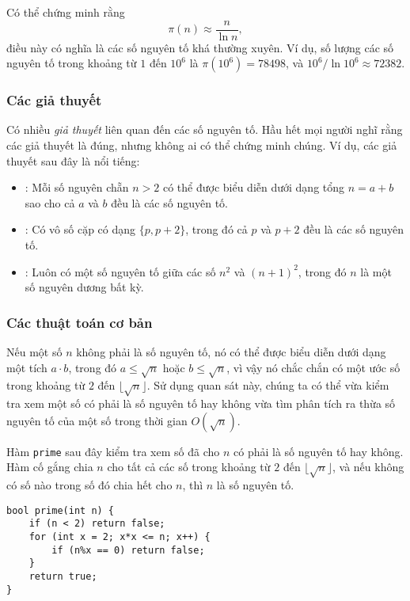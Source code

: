 Có thể chứng minh rằng
\[\pi(n) \approx \frac{n}{\ln n},\]
điều này có nghĩa là các số nguyên tố khá thường xuyên.
Ví dụ, số lượng các số nguyên tố trong khoảng từ
$1$ đến $10^6$ là $\pi(10^6)=78498$,
và $10^6 / \ln 10^6 \approx 72382$.

\subsubsection{Các giả thuyết}

Có nhiều \emph{giả thuyết} liên quan đến các số nguyên tố.
Hầu hết mọi người nghĩ rằng các giả thuyết là đúng,
nhưng không ai có thể chứng minh chúng.
Ví dụ, các giả thuyết sau đây là nổi tiếng:

\begin{itemize}
\item {}:
Mỗi số nguyên chẵn $n>2$ có thể được biểu diễn dưới dạng
tổng $n=a+b$ sao cho cả $a$ và $b$ đều là các số nguyên tố.
\item {}:
Có vô số cặp
có dạng $\{p,p+2\}$,
trong đó cả $p$ và $p+2$ đều là các số nguyên tố.
\item {}:
Luôn có một số nguyên tố giữa các số
$n^2$ và $(n+1)^2$, trong đó $n$ là một số nguyên dương bất kỳ.
\end{itemize}

\subsubsection{Các thuật toán cơ bản}

Nếu một số $n$ không phải là số nguyên tố,
nó có thể được biểu diễn dưới dạng một tích $a \cdot b$,
trong đó $a \le \sqrt n$ hoặc $b \le \sqrt n$,
vì vậy nó chắc chắn có một ước số trong khoảng từ $2$ đến $\lfloor \sqrt n \rfloor$.
Sử dụng quan sát này, chúng ta có thể vừa kiểm tra
xem một số có phải là số nguyên tố hay không vừa tìm phân tích ra thừa số nguyên tố
của một số trong thời gian $O(\sqrt n)$.

Hàm \texttt{prime} sau đây kiểm tra
xem số đã cho $n$ có phải là số nguyên tố hay không.
Hàm cố gắng chia $n$ cho
tất cả các số trong khoảng từ $2$ đến $\lfloor \sqrt n \rfloor$,
và nếu không có số nào trong số đó chia hết cho $n$, thì $n$ là số nguyên tố.

\begin{lstlisting}
bool prime(int n) {
    if (n < 2) return false;
    for (int x = 2; x*x <= n; x++) {
        if (n%x == 0) return false;
    }
    return true;
}
\end{lstlisting}

